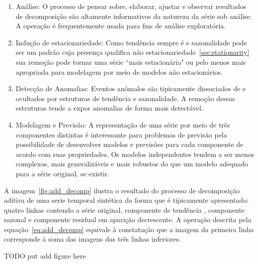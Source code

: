 \begin{enumerate}

    \item Análise: O processo de pensar sobre, elaborar, ajustar e observar
    resultados de decomposição são altamente informativos da natureza da
    série sob análise. A operação é frequentemente usada para fins de análise
    exploratória.

    \item Indução de estacionariedade: Como tendência sempre é e sazonalidade pode ser
    um padrão cuja presença qualifica não estacionariedade~\ref{sec:stationarity}
    sua remoção pode tornar uma série ``mais estacionária" ou pelo menos mais
    apropriada para modelagem por meio de modelos não estacionários.

    \item Detecção de Anomalias: Eventos anômalos são tipicamente dissociados
    de e ocultados por estruturas de tendência e sazonalidade. A remoção
    dessas estruturas tende a expor anomalias de forma mais detectável.

    \item Modelagem e Previsão: A representação de uma série por meio de três
    componentes distintas é interessante para problemas de previsão pela
    possibilidade de desenvolver modelos e previsões para cada componente de
    acordo com suas propriedades. Os modelos independentes tendem a ser menos
    complexos, mais generalizáveis e mais robustos do que um modelo adequado
    para a série original, se existir.

\end{enumerate}

A imagem~\ref{fig:add_decomp} ilustra o resultado do processo de
decomposição aditiva de uma serie temporal sintética da forma que é tipicamente
apresentado: quatro linhas contendo a série original, componente de tendência ,
componente sazonal e componente residual em aparição decrescente. A operação
descrita pela equação~\ref{eq:add_decomp} equivale à constatação que a
imagem da primeira linha corresponde à soma das imagens das três linhas
inferiores.

TODO put add figure here


